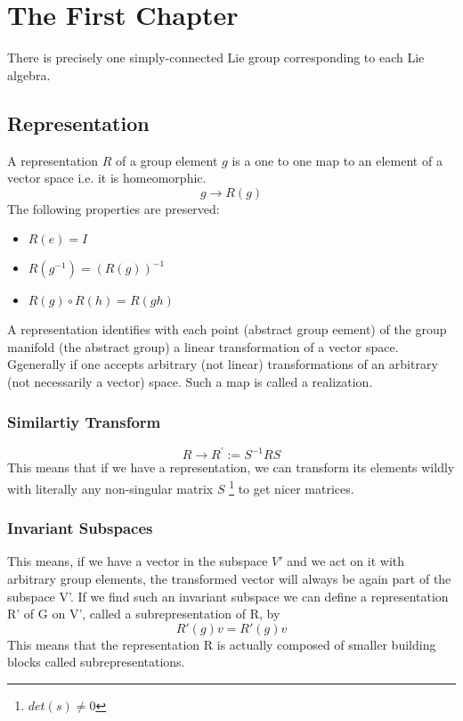 \chapter{The First Chapter}
There is precisely one simply-connected Lie group corresponding
to each Lie algebra.
\section{Representation}
A representation $R$ of a group element $g$ is a one to one map to an element of a vector space i.e. it is homeomorphic.
$$g \rightarrow R(g)$$
The following properties are preserved:
\begin{itemize}
\item $R(e) = I$
\item $R(g^{-1}) = (R(g))^{-1}$
\item $R(g) \circ R(h) = R(gh)$
\end{itemize}
A representation identifies with each point (abstract group eement) of the group manifold (the abstract group) a linear transformation of a vector space. Ggenerally if one accepts arbitrary (not linear) transformations of an arbitrary
(not necessarily a vector) space. Such a map is called a realization. 
\subsection{Similartiy Transform}
$$R \rightarrow R^{'} := S^{-1}RS$$
This means that if we have a representation, we can transform its elements wildly with literally any non-singular matrix $S$ \footnote{$det(s) \neq 0$} to get nicer matrices.
\subsection{Invariant Subspaces}
This means, if we have a vector in the subspace $V'$ and we act on it with arbitrary group elements, the transformed
vector will always be again part of the subspace V'. If we find such an invariant subspace we can define a representation R' of G on V', called a subrepresentation of R, by
$$R'(g)v = R'(g)v$$
This means that the representation R is actually composed of smaller building blocks called subrepresentations.
